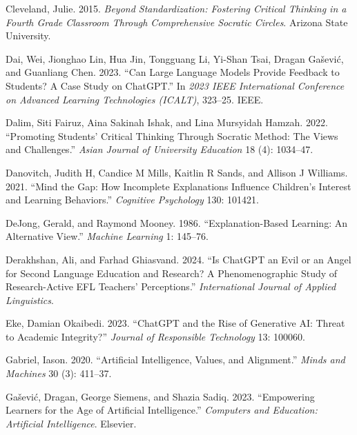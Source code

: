 \documentclass[
  11pt,
]{article}
\newlength{\cslhangindent}
\newenvironment{CSLReferences}[2] %
 {\begin{list}{}{%
  \setlength{\itemindent}{0pt}
  \setlength{\leftmargin}{0pt}
  \setlength{\parsep}{0pt}
  \ifodd #1
   \setlength{\leftmargin}{\cslhangindent}
   \setlength{\itemindent}{-1\cslhangindent}
  \fi
  \setlength{\itemsep}{#2\baselineskip}}}
 {\end{list}}
\begin{document}
\label{refs}
\begin{CSLReferences}{1}{0}
Cleveland, Julie. 2015. \emph{Beyond Standardization: Fostering Critical Thinking in a Fourth Grade Classroom Through Comprehensive Socratic Circles}. Arizona State University.

Dai, Wei, Jionghao Lin, Hua Jin, Tongguang Li, Yi-Shan Tsai, Dragan Gašević, and Guanliang Chen. 2023. {``Can Large Language Models Provide Feedback to Students? A Case Study on ChatGPT.''} In \emph{2023 IEEE International Conference on Advanced Learning Technologies (ICALT)}, 323--25. IEEE.

Dalim, Siti Fairuz, Aina Sakinah Ishak, and Lina Mursyidah Hamzah. 2022. {``Promoting Students' Critical Thinking Through Socratic Method: The Views and Challenges.''} \emph{Asian Journal of University Education} 18 (4): 1034--47.

Danovitch, Judith H, Candice M Mills, Kaitlin R Sands, and Allison J Williams. 2021. {``Mind the Gap: How Incomplete Explanations Influence Children's Interest and Learning Behaviors.''} \emph{Cognitive Psychology} 130: 101421.

DeJong, Gerald, and Raymond Mooney. 1986. {``Explanation-Based Learning: An Alternative View.''} \emph{Machine Learning} 1: 145--76.

Derakhshan, Ali, and Farhad Ghiasvand. 2024. {``Is ChatGPT an Evil or an Angel for Second Language Education and Research? A Phenomenographic Study of Research-Active EFL Teachers' Perceptions.''} \emph{International Journal of Applied Linguistics}.

Eke, Damian Okaibedi. 2023. {``ChatGPT and the Rise of Generative AI: Threat to Academic Integrity?''} \emph{Journal of Responsible Technology} 13: 100060.

Gabriel, Iason. 2020. {``Artificial Intelligence, Values, and Alignment.''} \emph{Minds and Machines} 30 (3): 411--37.

Gašević, Dragan, George Siemens, and Shazia Sadiq. 2023. {``Empowering Learners for the Age of Artificial Intelligence.''} \emph{Computers and Education: Artificial Intelligence}. Elsevier.


\end{CSLReferences}
\end{document}
